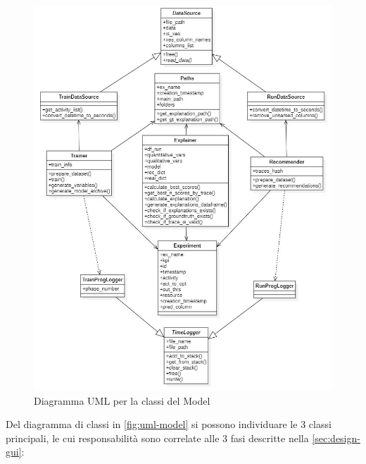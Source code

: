 \begin{figure}[H] 
    \centering 
    \includegraphics[width=1\columnwidth]{immagini/uml-model.jpg} 
    \caption{Diagramma UML per la classi del Model}
    \label{fig:uml-model}
\end{figure}



Del diagramma di classi in \autoref{fig:uml-model} si possono individuare le 3 classi principali, le cui responsabilità sono correlate alle 3 fasi descritte nella \autoref{sec:design-gui}:


